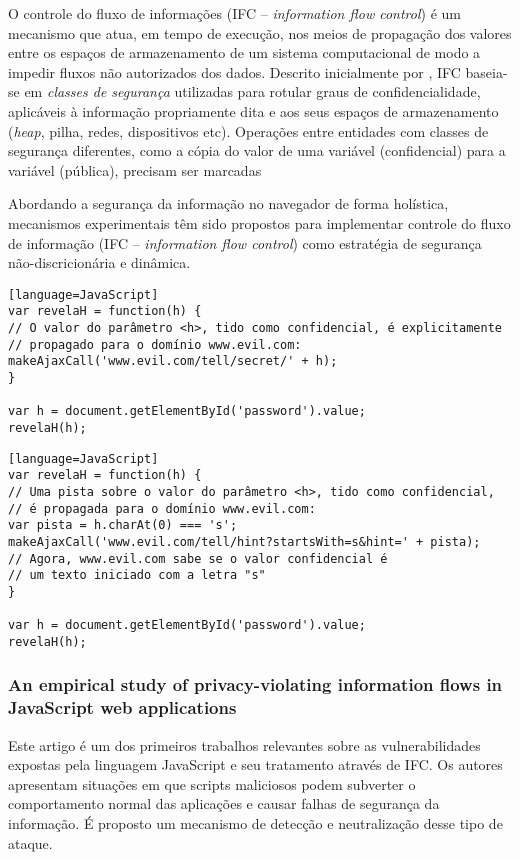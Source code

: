 O controle do fluxo de informações (IFC -- \textit{information flow control}) é um mecanismo que atua, em tempo de execução, nos meios de propagação dos valores entre os espaços de armazenamento de um sistema computacional de modo a impedir fluxos não autorizados dos dados. Descrito inicialmente por \cite{Denning1976}, IFC baseia-se em \textit{classes de segurança} utilizadas para rotular graus de confidencialidade, aplicáveis à informação propriamente dita e aos seus espaços de armazenamento (\textit{heap}, pilha, redes, dispositivos etc). Operações entre entidades com classes de segurança diferentes, como a cópia do valor de uma variável  (confidencial) para a variável  (pública), precisam ser marcadas 

Abordando a segurança da informação no navegador de forma holística, mecanismos experimentais têm sido propostos para implementar controle do fluxo de informação (IFC -- \textit{information flow control}) como estratégia de segurança não-discricionária e dinâmica.

\begin{lstlisting}[caption=Fluxo explícito de informação][language=JavaScript]
var revelaH = function(h) {
// O valor do parâmetro <h>, tido como confidencial, é explicitamente
// propagado para o domínio www.evil.com:
makeAjaxCall('www.evil.com/tell/secret/' + h);
}

var h = document.getElementById('password').value;
revelaH(h);
\end{lstlisting}


\begin{lstlisting}[caption=Fluxo implícito de informação][language=JavaScript]
var revelaH = function(h) {
// Uma pista sobre o valor do parâmetro <h>, tido como confidencial,
// é propagada para o domínio www.evil.com:
var pista = h.charAt(0) === 's';
makeAjaxCall('www.evil.com/tell/hint?startsWith=s&hint=' + pista);
// Agora, www.evil.com sabe se o valor confidencial é
// um texto iniciado com a letra "s"
}

var h = document.getElementById('password').value;
revelaH(h);
\end{lstlisting}






\subsubsection{An empirical study of privacy-violating information flows in JavaScript web applications \cite{Jang2010}}
Este artigo é um dos primeiros trabalhos relevantes sobre as vulnerabilidades expostas pela linguagem JavaScript e seu tratamento através de IFC. Os autores apresentam situações em que scripts maliciosos podem subverter o comportamento normal das aplicações e causar falhas de segurança da informação. É proposto um mecanismo de detecção e neutralização desse tipo de ataque.

